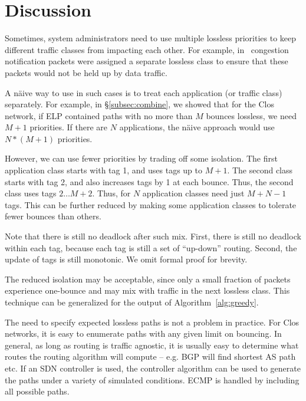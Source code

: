 \section{Discussion}

 Sometimes, system administrators need to
use multiple lossless priorities to keep different traffic classes from
impacting each other. For example, in~\cite{dcqcn} congestion notification
packets were assigned a separate lossless class to ensure that these packets
would not be held up by data traffic.

A n{\"a}ive way to use \sysname{} in such cases is to treat each application (or
traffic class) separately.  For example, in \S\ref{subsec:combine}, we showed
that for the Clos network, if ELP contained paths with no more than $M$ bounces
lossless, we need $M+1$ priorities. If there are $N$ applications, the n{\"a}ive
approach would use $N*(M+1)$ priorities. 

However, we can use fewer priorities by trading off some isolation.  The first
application class starts with tag 1, and uses tags up to $M+1$.  The second
class starts with tag 2, and also increases tags by 1 at each
bounce.  Thus, the second class uses tags $2 \ldots M+2$. Thus, for
$N$ application classes need just $M + N -1$ tags. This can be further reduced
by making some application classes to tolerate fewer bounces than others.

Note that there is still no deadlock after such mix. First, there is still no
deadlock within each tag, because each tag is still a set of ``up-down''
routing. Second, the update of tags is still monotonic. We omit formal proof for
brevity.

The reduced isolation may be acceptable, since only a small fraction of packets
experience one-bounce and may mix with traffic in the next lossless class.  This
technique can be generalized for the output of Algorithm~\ref{alg:greedy}.

 The need to specify expected lossless paths is not a
problem in practice. For Clos networks, it is easy to enumerate paths with any
given limit on bouncing. In general, as long as routing is traffic agnostic, it
is usually easy to determine what routes the routing algorithm will compute --
e.g. BGP will find shortest AS path etc.  If an SDN controller is used, the
controller algorithm can be used to generate the paths under a variety of
simulated conditions. ECMP is handled by including all possible paths.

